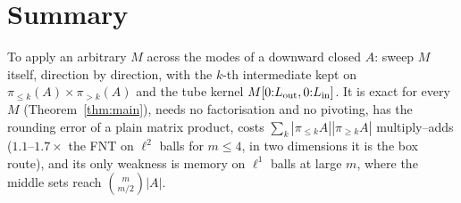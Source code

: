 \documentclass[11pt]{article}
\newcommand{\pr}[1]{\pi_{#1}}
\begin{document}
\section{Summary}
To apply an arbitrary $M$ across the modes of a downward closed $A$: sweep $M$ itself, direction by direction, with the
$k$-th intermediate kept on $\pr{\le k}(A)\times\pr{>k}(A)$ and the tube kernel $M[0{:}L_{\rm out},0{:}L_{\rm in}]$. It is exact for every
$M$ (Theorem~\ref{thm:main}), needs no factorisation and no pivoting, has the rounding error of a plain matrix product, costs
$\sum_k|\pr{\le k}A||\pr{\ge k}A|$ multiply--adds ($1.1$--$1.7\times$ the FNT on $\ell^2$ balls for $m\le4$, in two dimensions it is the
box route), and its only weakness is memory on $\ell^1$ balls at large $m$, where the middle sets reach $\binom{m}{m/2}|A|$.
\end{document}
